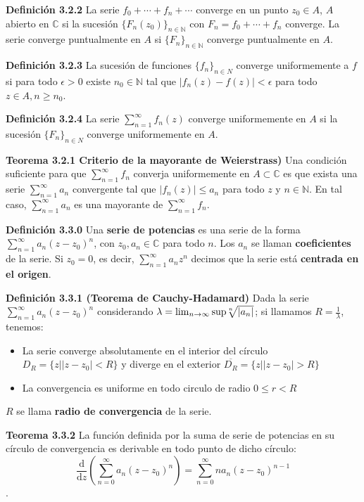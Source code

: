 \documentclass[a4paper, 11pt]{extarticle}
\newcommand{\tma}[1]{\textcolor{rojo}{\textbf{Teorema #1}}}
\newcommand{\defi}[1]{\textcolor{azul}{\textbf{Definición #1}}}
\begin{document}
\begin{multicols*}{2}
\defi{3.2.2} La serie \(f_0 + \cdots + f_n + \cdots\) converge en un punto \(z_0 \in A\), \(A\) abierto en \(\mathbb{C}\) si la sucesión \(\{ F_n(z_0) \}_{n
\in \mathbb{N}}\) con \(F_n = f_0 + \cdots + f_n\)
converge. La serie converge puntualmente en \(A\) si \(\{ F_n \}_{n \in
\mathbb{N}}\) converge puntualmente en \(A\).

\defi{3.2.3} La sucesión de funciones \(\{ f_n \}_{n \in N}\) converge
uniformemente a \(f\) si para todo \(\epsilon > 0\) existe \(n_0 \in
\mathbb{N}\) tal que \(|f_n(z) - f(z)| < \epsilon\) para todo \(z \in A, n
\ge n_0\). 

\defi{3.2.4} La serie \(\sum _{n=1}^{\infty} f_n(z)\) converge uniformemente
en \(A\) si la sucesión \(\{ F_n \}_{n \in N}\) converge uniformemente en \(A\).

\tma{3.2.1 Criterio de la mayorante de Weierstrass)} Una condición suficiente
para que \(\sum _{n=1}^{\infty} f_n\) converja uniformemente en \(A \subset
\mathbb{C}\) es que exista una serie \(\sum _{n=1}^{\infty} a_n\) convergente
tal que \(|f_n(z)| \le a_n\) para todo \(z\) y \(n \in \mathbb{N}\).
En tal caso, \(\sum _{n=1}^{\infty} a_n\) es una mayorante de \(\sum
_{n=1}^{\infty} f_n\). 

\defi{3.3.0} Una \textbf{serie de potencias} es una serie de la forma \(\sum
_{n=1}^{\infty} a_n(z - z_0)^n\), con \(z_0, a_n \in \mathbb{C}\) para todo
\(n\). Los \(a_n\) se llaman \textbf{coeficientes} de la serie.
Si \(z_0=0\), es decir, \(\sum _{n=1}^{\infty} a_nz^n\) decimos que la serie
está \textbf{centrada en el origen}.

\defi{3.3.1 (Teorema de Cauchy-Hadamard)} Dada la serie \(\sum _{n=1}^{\infty}
a_n(z - z_0)^n\) considerando  \(\lambda = \lim_{n \to \infty} \text{sup} \sqrt[\leftroot{1}\uproot{1}n]{|a_n|}\); si llamamos \(R = \frac{1}{\lambda}\), tenemos:
\begin{itemize}
\item La serie converge absolutamente en el interior del círculo \(D_R = \{z| |z-z_0| < R \}\) y diverge en el exterior \(\overline{D_R} = \{ z| |z-z_0|> R \}\)
\item La convergencia es uniforme en todo circulo de radio \(0 \le r < R\)
\end{itemize}
\(R\) se llama \textbf{radio de convergencia} de la serie. 


\tma{3.3.2} La función definida por la suma de serie de potencias en su círculo
de convergencia es derivable en todo punto de dicho círculo:
\[ \frac{\text{d}}{\text{d}z} \left( \sum _{n=0}^{\infty}a_n(z-z_0)^n \right) = 
\sum _{n=0}^{\infty}na_n(z-z_0)^{n-1} \].


\end{multicols*}
\end{document}
